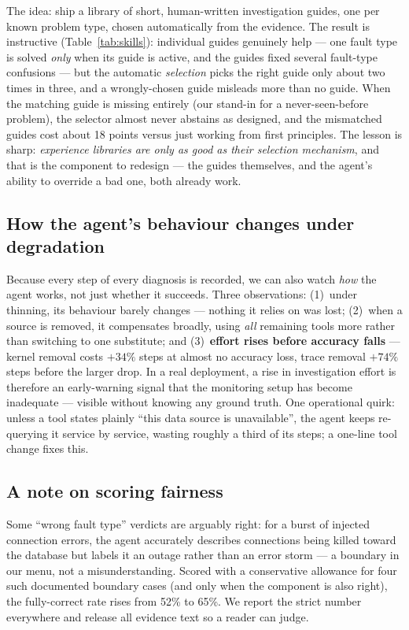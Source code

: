 The idea: ship a library of short, human-written investigation guides, one per known
problem type, chosen automatically from the evidence. The result is instructive
(Table~\ref{tab:skills}): individual guides genuinely help --- one fault type is
solved \emph{only} when its guide is active, and the guides fixed several
fault-type confusions --- but the automatic \emph{selection} picks the right guide
only about two times in three, and a wrongly-chosen guide misleads more than no
guide. When the matching guide is missing entirely (our stand-in for a
never-seen-before problem), the selector almost never abstains as designed, and the
mismatched guides cost about 18 points versus just working from first principles.
The lesson is sharp: \emph{experience libraries are only as good as their selection
mechanism}, and that is the component to redesign --- the guides themselves, and the
agent's ability to override a bad one, both already work.

\subsection{How the agent's behaviour changes under degradation}

Because every step of every diagnosis is recorded, we can also watch \emph{how} the
agent works, not just whether it succeeds. Three observations: (1)~under thinning,
its behaviour barely changes --- nothing it relies on was lost; (2)~when a source is
removed, it compensates broadly, using \emph{all} remaining tools more rather than
switching to one substitute; and (3)~\textbf{effort rises before accuracy falls} ---
kernel removal costs $+34\%$ steps at almost no accuracy loss, trace removal $+74\%$
steps before the larger drop. In a real deployment, a rise in investigation effort
is therefore an early-warning signal that the monitoring setup has become
inadequate --- visible without knowing any ground truth. One operational quirk:
unless a tool states plainly ``this data source is unavailable'', the agent keeps
re-querying it service by service, wasting roughly a third of its steps; a one-line
tool change fixes this.

\subsection{A note on scoring fairness}

Some ``wrong fault type'' verdicts are arguably right: for a burst of injected
connection errors, the agent accurately describes connections being killed toward
the database but labels it an outage rather than an error storm --- a boundary in
our menu, not a misunderstanding. Scored with a conservative allowance for four such
documented boundary cases (and only when the component is also right), the
fully-correct rate rises from 52\% to 65\%. We report the strict number everywhere
and release all evidence text so a reader can judge.
